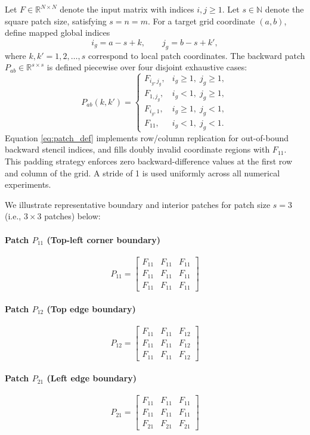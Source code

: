 \documentclass[pdflatex,sn-mathphys-num]{sn-jnl}%
\theoremstyle{thmstyleone}%
\theoremstyle{thmstyletwo}%
\theoremstyle{thmstylethree}%
\begin{document}
Let $F\in\mathbb{R}^{N\times N}$ denote the input matrix with indices $i,j\geq 1$. Let $s\in\mathbb{N}$ denote the square patch size, satisfying $s=n=m$. For a target grid coordinate $(a,b)$, define mapped global indices
\[
i_g = a-s+k,\qquad j_g = b-s+k',
\]
where $k,k' = 1,2,\dots,s$ correspond to local patch coordinates. The backward patch $P_{ab}\in\mathbb{R}^{s\times s}$ is defined piecewise over four disjoint exhaustive cases:
\begin{equation}
P_{ab}(k,k')=
\begin{cases}
F_{i_g,j_g}, & i_g\geq 1,\; j_g\geq 1,\\
F_{1,j_g}, & i_g< 1,\; j_g\geq 1,\\
F_{i_g,1}, & i_g\geq 1,\; j_g< 1,\\
F_{11}, & i_g< 1,\; j_g< 1.
\end{cases}
\label{eq:patch_def}
\end{equation}
Equation \eqref{eq:patch_def} implements row/column replication for out-of-bound backward stencil indices, and fills doubly invalid coordinate regions with $F_{11}$. This padding strategy enforces zero backward-difference values at the first row and column of the grid. A stride of 1 is used uniformly across all numerical experiments.

We illustrate representative boundary and interior patches for patch size $s=3$ (i.e., $3\times 3$ patches) below:

\paragraph{Patch $P_{11}$ (Top-left corner boundary)}
\[
P_{11}=
\begin{bmatrix}
F_{11} & F_{11} & F_{11}\\
F_{11} & F_{11} & F_{11}\\
F_{11} & F_{11} & F_{11}
\end{bmatrix}
\]

\paragraph{Patch $P_{12}$ (Top edge boundary)}
\[
P_{12}=
\begin{bmatrix}
F_{11} & F_{11} & F_{12}\\
F_{11} & F_{11} & F_{12}\\
F_{11} & F_{11} & F_{12}
\end{bmatrix}
\]

\paragraph{Patch $P_{21}$ (Left edge boundary)}
\[
P_{21}=
\begin{bmatrix}
F_{11} & F_{11} & F_{11}\\
F_{11} & F_{11} & F_{11}\\
F_{21} & F_{21} & F_{21}
\end{bmatrix}
\]
\end{document}
